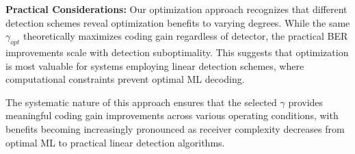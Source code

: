 \textbf{Practical Considerations:} Our optimization approach recognizes that different detection schemes reveal optimization benefits to varying degrees. 
While the same $\gamma_{opt}$ theoretically maximizes coding gain regardless of detector, the practical BER improvements scale with detection suboptimality. 
This suggests that optimization is most valuable for systems employing linear detection schemes, where computational constraints prevent optimal ML decoding.

The systematic nature of this approach ensures that the selected $\gamma$ provides meaningful coding gain improvements across various operating conditions, with benefits becoming increasingly pronounced as receiver complexity decreases from optimal ML to practical linear detection algorithms.
